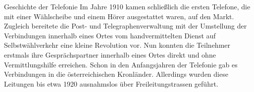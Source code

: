 \begin{section}{Geschichte der Telefonie}
 	Im Jahre 1910 kamen schließlich die ersten Telefone, die mit einer Wählscheibe und 
 	einem Hörer ausgestattet waren, auf den Markt. Zugleich bereitete die 
 	Post- und Telegraphenverwaltung mit der Umstellung der Verbindungen innerhalb eines Ortes 
 	vom handvermittelten Dienst auf Selbstwählverkehr eine kleine Revolution vor. 
 	Nun konnten die Teilnehmer erstmals ihre Gesprächspartner innerhalb eines Ortes 
 	direkt und ohne Vermittlungshilfe erreichen. Schon in den Anfangsjahren der Telefonie 
 	gab es Verbindungen in die österreichischen Kronländer. Allerdings wurden diese Leitungen 
 	bis etwa 1920 ausnahmslos über Freileitungstrassen geführt. \\

 	\cite{stadtwien2012Telefon}
 	\pagebreak
 \end{section}
 
